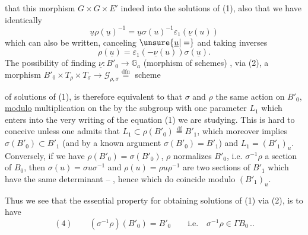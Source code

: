 
  that this morphism   $G\times G\times E'$   indeed into the solutions of (1),   also that we have identically
\[
\underline u\rho(\underline u)^{-1}=\underline u\sigma(u)^{-1}\varepsilon_1(\underline\nu(u))
\]
which can also be written, canceling $\unsure{\underline u|=}$ and taking inverses
\[
\tag{3}
\rho(\underline u)=\varepsilon_1(-\underline\nu(u))\sigma(\underline u).
\]
The possibility of finding $\underline\nu:B'_0\longrightarrow \mathbb G_a$ (morphism of schemes) , via (2), a morphism $B'_0\times T_\rho\times T_\sigma\longrightarrow\mathcal G_{\rho,\sigma}\overset{\mathrm{dfn}}{=}$ scheme




of solutions of (1), is therefore equivalent to that
  $\sigma$ and $\rho$
 the same action
on $B'_0$, \uline{modulo} multiplication on the  by
 the subgroup 
 with one parameter $L_1$ which
enters into the very writing of the equation (1) we are studying.
This is hard to conceive unless one admits that
$L_1\subset\rho(B'_0)\overset{\mathrm{df}}=B'_1$, which moreover implies
$\sigma(B'_0)\subset B'_1$ (and by a known argument $\sigma(B'_0)=B'_1$)
and $L_1=(B'_1)_u$. Conversely, if we have
$\rho(B'_0)=\sigma(B'_0)$, 
\deleted{$\unsure{\rho(-)}$}$\rho$ normalizes $B'_0$,
 i.e. $\sigma^{-1}\rho$ a section of $B_0$, then
$\sigma(u)=\sigma u\sigma^{-1}$ and $\rho(u)=\rho u\rho^{-1}$ are two sections
of $B'_1$ which have the same determinant -- ,
hence which do coincide modulo $(B'_1)_u$.

Thus we see that the essential property for obtaining solutions of (1) via (2),
is to have
\[
(4)\qquad (\sigma^{-1}\rho)(B'_0)=B'_0\qquad\text{i.e.}\quad
\sigma^{-1}\rho\in\Gamma B_0\, ..
\]

